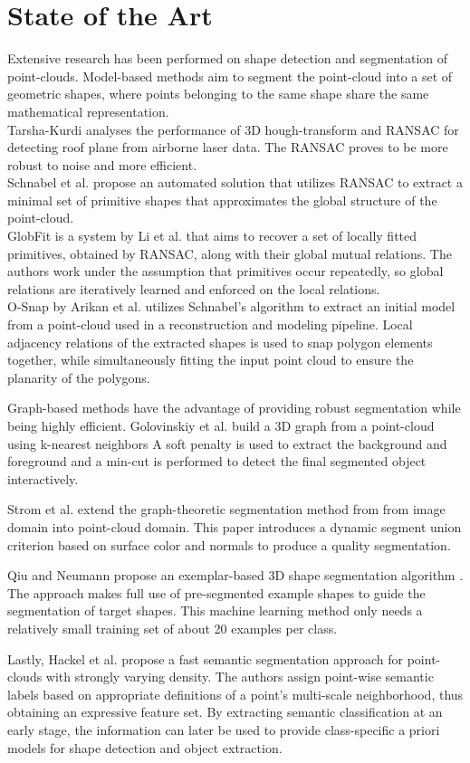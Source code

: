 \section{State of the Art}
Extensive research has been performed on shape detection and segmentation of point-clouds. Model-based methods aim to segment the point-cloud into a set of geometric shapes, where points belonging to the same shape share the same mathematical representation. 
\\
Tarsha-Kurdi\cite{tarsha2007hough} analyses the performance of 3D hough-transform and RANSAC for detecting roof plane from airborne laser data. The RANSAC proves to be more robust to noise and more efficient.
\\
Schnabel et al. \cite{schnabel-2007-efficient} propose an automated solution that utilizes RANSAC to extract a minimal set of primitive shapes that approximates the global structure of the point-cloud.  
\\
GlobFit is a system by Li et al. \cite{li2011globfit} that aims to recover a set of locally fitted primitives, obtained by RANSAC, along with their global mutual relations. The authors work under the assumption that primitives occur repeatedly, so global relations are iteratively learned and enforced on the local relations. 
\\
O-Snap by Arikan et al. \cite{arikan-2013-osn} utilizes Schnabel's algorithm to extract an initial model from a point-cloud used in a reconstruction and modeling pipeline. Local adjacency relations of the extracted shapes is used to snap polygon elements together, while simultaneously fitting the input point cloud to ensure the planarity of the polygons. 

Graph-based methods have the advantage of providing robust segmentation while being highly efficient. Golovinskiy et al. \cite{golovinskiy2009min} build a 3D graph from a point-cloud using k-nearest neighbors A soft penalty is used to extract the background and foreground and a min-cut is performed to detect the final segmented object interactively. 

Strom et al. \cite{strom2010graph} extend the graph-theoretic segmentation method from \cite{felzenszwalb2004efficient} from image domain into point-cloud domain. This paper introduces a dynamic segment union criterion based on surface color and normals to produce a quality segmentation. 

Qiu and Neumann propose an exemplar-based 3D shape segmentation algorithm  \cite{qiu2016exemplar}. The approach makes full use of pre-segmented example shapes to guide the segmentation of target shapes. This machine learning method only needs a relatively small training set of about 20 examples per class.  

Lastly, Hackel et al. \cite{hackel2016fast} propose a fast semantic segmentation approach for point-clouds with strongly varying density. The authors assign point-wise semantic labels based on appropriate definitions of a point's multi-scale neighborhood, thus obtaining an expressive feature set. 
By extracting semantic classification at an early stage, the information can later be used to provide class-specific a priori models for shape detection and object extraction. 



